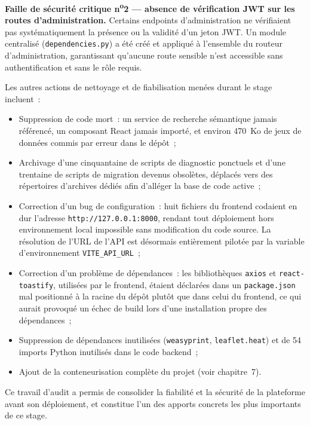 \documentclass[11pt,a4paper]{report}
\begin{document}
\begin{warnbox}
\textbf{Faille de sécurité critique n\textsuperscript{o}2 --- absence de vérification JWT sur les routes
d'administration.} Certains endpoints d'administration ne vérifiaient pas systématiquement la présence ou la
validité d'un jeton JWT. Un module centralisé (\texttt{dependencies.py}) a été créé et appliqué à l'ensemble
du routeur d'administration, garantissant qu'aucune route sensible n'est accessible sans authentification et
sans le rôle requis.
\end{warnbox}

Les autres actions de nettoyage et de fiabilisation menées durant le stage incluent~:

\begin{itemize}
  \item Suppression de code mort~: un service de recherche sémantique jamais référencé, un composant React
    jamais importé, et environ 470~Ko de jeux de données commis par erreur dans le dépôt~;
  \item Archivage d'une cinquantaine de scripts de diagnostic ponctuels et d'une trentaine de scripts de
    migration devenus obsolètes, déplacés vers des répertoires d'archives dédiés afin d'alléger la base de
    code active~;
  \item Correction d'un bug de configuration~: huit fichiers du frontend codaient en dur l'adresse
    \texttt{http://127.0.0.1:8000}, rendant tout déploiement hors environnement local impossible sans
    modification du code source. La résolution de l'URL de l'API est désormais entièrement pilotée par la
    variable d'environnement \texttt{VITE\_API\_URL}~;
  \item Correction d'un problème de dépendances~: les bibliothèques \texttt{axios} et
    \texttt{react-toastify}, utilisées par le frontend, étaient déclarées dans un \texttt{package.json} mal
    positionné à la racine du dépôt plutôt que dans celui du frontend, ce qui aurait provoqué un échec de
    build lors d'une installation propre des dépendances~;
  \item Suppression de dépendances inutilisées (\texttt{weasyprint}, \texttt{leaflet.heat}) et de 54 imports
    Python inutilisés dans le code backend~;
  \item Ajout de la conteneurisation complète du projet (voir chapitre~7).
\end{itemize}

Ce travail d'audit a permis de consolider la fiabilité et la sécurité de la plateforme avant son
déploiement, et constitue l'un des apports concrets les plus importants de ce stage.
\end{document}
